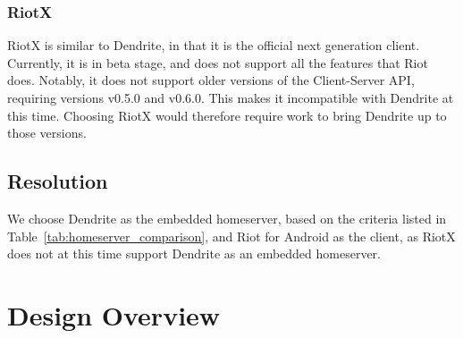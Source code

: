 \subsubsection{RiotX}
RiotX is similar to Dendrite, in that it is the official next generation client.
Currently, it is in beta stage, and does not support all the features that Riot does.
Notably, it does not support older versions of the Client-Server API, requiring versions v0.5.0 and v0.6.0.
This makes it incompatible with Dendrite at this time.
Choosing RiotX would therefore require work to bring Dendrite up to those versions.

\subsection{Resolution}
We choose Dendrite as the embedded homeserver, based on the criteria listed in Table~\ref{tab:homeserver_comparison}, and Riot for Android as the client, as RiotX does not at this time support Dendrite as an embedded homeserver.

\section{Design Overview}

